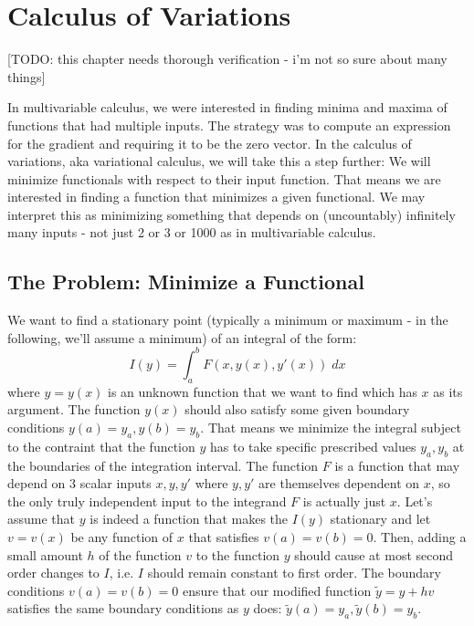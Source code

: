 \section{Calculus of Variations} 

[TODO: this chapter needs thorough verification - i'm not so sure about many things]

In multivariable calculus, we were interested in finding minima and maxima of functions that had multiple inputs. The strategy was to compute an expression for the gradient and requiring it to be the zero vector. In the calculus of variations, aka variational calculus, we will take this a step further: We will minimize functionals with respect to their input function. That means we are interested in finding a function that minimizes a given functional. We may interpret this as minimizing something that depends on (uncountably) infinitely many inputs - not just 2 or 3 or 1000 as in multivariable calculus.


\subsection{The Problem: Minimize a Functional}
We want to find a stationary point (typically a minimum or maximum - in the following, we'll assume a minimum) of an integral of the form:
\begin{equation}
 I(y) = \int_a^b F(x,y(x),y'(x)) \; dx
\end{equation}
where $y = y(x)$ is an unknown function that we want to find which has $x$ as its argument. The function $y(x)$ should also satisfy some given boundary conditions $y(a) = y_a, y(b) = y_b$. That means we minimize the integral subject to the contraint that the function $y$ has to take specific prescribed values $y_a, y_b$ at the boundaries of the integration interval. The function $F$ is a function that may depend on 3 scalar inputs $x,y,y'$ where $y,y'$ are themselves dependent on $x$, so the only truly independent input to the integrand $F$ is actually just $x$. Let's assume that $y$ is indeed a function that makes the $I(y)$ stationary and let $v = v(x)$ be any function of $x$ that satisfies $v(a) = v(b) = 0$. Then, adding a small amount $h$ of the function $v$ to the function $y$ should cause at most second order changes to $I$, i.e. $I$ should remain constant to first order. The boundary conditions $v(a) = v(b) = 0$ ensure that our modified function $\tilde{y} = y + h v$ satisfies the same boundary conditions as $y$ does: $\tilde{y}(a) = y_a, \tilde{y}(b) = y_b$.

